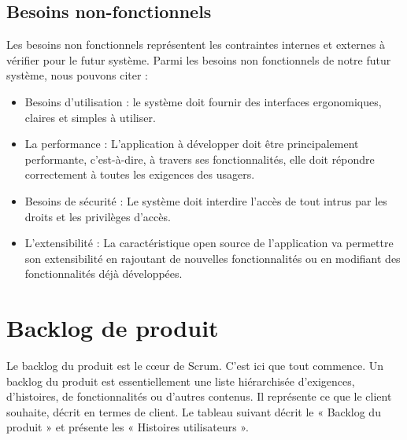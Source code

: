 \begin{sloppypar}
\subsection{Besoins non-fonctionnels}
\vspace{-3mm}
Les besoins non fonctionnels représentent les contraintes internes et externes à vérifier pour le futur système. Parmi les besoins non fonctionnels de notre futur système, nous pouvons citer :

\begin{itemize}
    \item Besoins d’utilisation : le système doit fournir des interfaces ergonomiques, claires et simples à utiliser.
    \item La performance : L’application à développer doit être principalement performante, c’est-à-dire, à travers ses fonctionnalités, elle doit répondre correctement à toutes les exigences des usagers.
    \item Besoins de sécurité : Le système doit interdire l’accès de tout intrus par les droits et les privilèges d’accès.
    \item L’extensibilité : La caractéristique open source de l’application va permettre son extensibilité en rajoutant de nouvelles fonctionnalités ou en modifiant des fonctionnalités déjà développées.
\end{itemize}

\vspace{-2cm}


\section{Backlog de produit  }
\vspace{-7mm}
Le backlog du produit est le cœur de Scrum. C’est ici que tout commence. Un backlog du produit est essentiellement une liste hiérarchisée d’exigences, d’histoires, de fonctionnalités ou d'autres contenus. Il représente ce que le client souhaite, décrit en termes de client. Le tableau suivant décrit le « Backlog du produit » et présente les « Histoires utilisateurs ».

\vspace{19mm}


\end{sloppypar}

